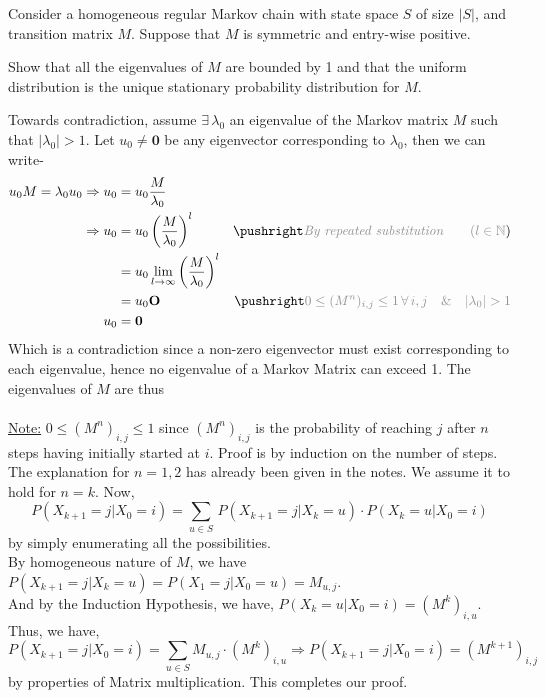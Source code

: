\documentclass[12pt,titlepage]{report}
\begin{document}
Consider a homogeneous regular Markov chain with state space $S$ of size $|S|$, and transition matrix $M$. Suppose that $M$ is symmetric and entry-wise positive.
\begin{enumerate}[label=(\alph*)]
    \hypertarget{q3a}{\item} Show that all the eigenvalues of $M$ are bounded by 1 and that the uniform distribution is the unique stationary probability distribution for $M$.
    \item[\underline{\textit{Solution:}}] Towards contradiction, assume $\exists\, \lambda_0$ an eigenvalue of the Markov matrix $M$ such that $|\lambda_0|>1$. Let $u_0\neq \mathbf{0}$ be any eigenvector corresponding to $\lambda_0$, then we can write-
    \begin{align*}
        u_0M=\lambda_0u_0 \Rightarrow u_0 &= u_0\frac{M}{\lambda_0} \\
        \Rightarrow u_0 &= u_0\left(\frac{M}{\lambda_0}\right)^l \comment{\textit{By repeated substitution} \qquad  (l\in\mathbb{N}}) \\
        &= u_0\lim_{l\rightarrow\infty} \left(\frac{M}{\lambda_0}\right)^l \\
        &= u_0\mathbf{O} \comment{0\leq(M^n)_{i,j}\leq1\,\forall\,i,j\quad \&\quad |\lambda_0|>1} \\
        u_0&= \mathbf{0}
    \end{align*}
    Which is a contradiction since a non-zero eigenvector must exist corresponding to each eigenvalue, hence no eigenvalue of a Markov Matrix can exceed 1. The eigenvalues of $M$ are thus \\ \\
    \underline{Note:} $0\leq(M^n)_{i,j}\leq1$ since $(M^n)_{i,j}$ is the probability of reaching $j$ after $n$ steps having initially started at $i$. Proof is by induction on the number of steps. The explanation for $n=1,2$ has already been given in the notes. We assume it to hold for $n=k$. Now, $$P(X_{k+1}=j| X_0=i)=\sum_{u\in S}\,P(X_{k+1}=j|X_k=u)\cdot P(X_k=u|X_0=i)$$
    by simply enumerating all the possibilities.\\
    By homogeneous nature of $M$, we have $P(X_{k+1}=j|X_k=u)=P(X_1=j|X_0=u)=M_{u,j}$. \\
    And by the Induction Hypothesis, we have, $P(X_k=u|X_0=i)=(M^k)_{i,u}$. \\
    Thus, we have,
    $$P(X_{k+1}=j| X_0=i)=\sum_{u\in S} M_{u,j}\cdot(M^k)_{i,u}\Rightarrow P(X_{k+1}=j| X_0=i)=(M^{k+1})_{i,j}$$
    by properties of Matrix multiplication. This completes our proof.\\

\end{enumerate}
\end{document}
